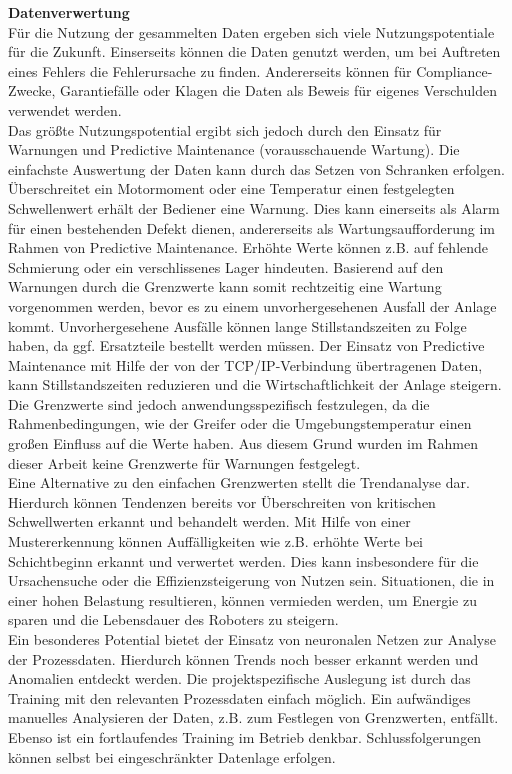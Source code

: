 \documentclass[ a4paper,
                oneside,
                toc=bibliography,
                toc=listof
                ]{scrbook}
\begin{document}
   	\textbf{Datenverwertung}\\
   	Für die Nutzung der gesammelten Daten ergeben sich viele Nutzungspotentiale für die Zukunft. Einserseits können die Daten genutzt werden, um bei Auftreten eines Fehlers die Fehlerursache zu finden. Andererseits können für Compliance-Zwecke, Garantiefälle oder Klagen die Daten als Beweis für eigenes Verschulden verwendet werden.\\
   	Das größte Nutzungspotential ergibt sich jedoch durch den Einsatz für Warnungen und Predictive Maintenance (vorausschauende Wartung). Die einfachste Auswertung der Daten kann durch das Setzen von Schranken erfolgen. Überschreitet ein Motormoment oder eine Temperatur einen festgelegten Schwellenwert erhält der Bediener eine Warnung. Dies kann einerseits als Alarm für einen bestehenden Defekt dienen, andererseits als Wartungsaufforderung im Rahmen von Predictive Maintenance. Erhöhte Werte können z.B. auf fehlende Schmierung oder ein verschlissenes Lager hindeuten. Basierend auf den Warnungen durch die Grenzwerte kann somit rechtzeitig eine Wartung vorgenommen werden, bevor es zu einem unvorhergesehenen Ausfall der Anlage kommt. Unvorhergesehene Ausfälle können lange Stillstandszeiten zu Folge haben, da ggf. Ersatzteile bestellt werden müssen. Der Einsatz von Predictive Maintenance mit Hilfe der von der TCP/IP-Verbindung übertragenen Daten, kann Stillstandszeiten reduzieren und die Wirtschaftlichkeit der Anlage steigern.
   	Die Grenzwerte sind jedoch anwendungsspezifisch festzulegen, da die Rahmenbedingungen, wie der Greifer oder die Umgebungstemperatur einen großen Einfluss auf die Werte haben. Aus diesem Grund wurden im Rahmen dieser Arbeit keine Grenzwerte für Warnungen festgelegt.\\
   	Eine Alternative zu den einfachen Grenzwerten stellt die Trendanalyse dar. Hierdurch können Tendenzen bereits vor Überschreiten von kritischen Schwellwerten erkannt und behandelt werden. Mit Hilfe von einer Mustererkennung können Auffälligkeiten wie z.B. erhöhte Werte bei Schichtbeginn erkannt und verwertet werden. Dies kann insbesondere für die Ursachensuche oder die Effizienzsteigerung von Nutzen sein. Situationen, die in einer hohen Belastung resultieren, können vermieden werden, um Energie zu sparen und die Lebensdauer des Roboters zu steigern.\\
   	Ein besonderes Potential bietet der Einsatz von neuronalen Netzen zur Analyse der Prozessdaten. Hierdurch können Trends noch besser erkannt werden und Anomalien entdeckt werden. Die projektspezifische Auslegung ist durch das Training mit den relevanten Prozessdaten einfach möglich. Ein aufwändiges manuelles Analysieren der Daten, z.B. zum Festlegen von Grenzwerten, entfällt. Ebenso ist ein fortlaufendes Training im Betrieb denkbar. Schlussfolgerungen können selbst bei eingeschränkter Datenlage erfolgen. \cite{bink2018predictive}\\
\end{document}
